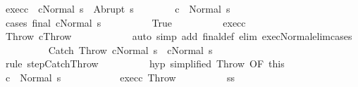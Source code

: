 \begin{isabellebody}
\ exec{\isacharunderscore}c\ {\isachardoublequoteopen}{\isasymGamma}{\isasymturnstile}\ {\isasymlangle}cNormal\ s{\isasymrangle}\ {\isasymRightarrow}\ Abrupt\ s{\isacharprime}{\isachardoublequoteclose}\isanewline
\ \ \ \ \ \ \isamarkupfalse%
\ {\isachardoublequoteopen}{\isasymGamma}{\isasymturnstile}c\ {\isasymdown}\ Normal\ s{\isacharprime}{\isachardoublequoteclose}\isanewline
\ \ \ \ \ \ \isamarkupfalse%
\ {\isacharparenleft}cases\ {\isachardoublequoteopen}final\ {\isacharparenleft}cNormal\ s{\isacharparenright}{\isachardoublequoteclose}{\isacharparenright}\isanewline
\ \ \ \ \ \ \ \ \isamarkupfalse%
\ True\isanewline
\ \ \ \ \ \ \ \ \isamarkupfalse%
\ exec{\isacharunderscore}c\isanewline
\ \ \ \ \ \ \ \ \isamarkupfalse%
\ Throw{\isacharcolon}\ {\isachardoublequoteopen}cThrow{\isachardoublequoteclose}\isanewline
\ \ \ \ \ \ \ \ \ \ \isamarkupfalse%
\ {\isacharparenleft}auto\ simp\ add{\isacharcolon}\ final{\isacharunderscore}def\ elim{\isacharcolon}\ exec{\isacharunderscore}Normal{\isacharunderscore}elim{\isacharunderscore}cases{\isacharparenright}\isanewline
\ \ \ \ \ \ \ \ \isamarkupfalse%
\ {\isachardoublequoteopen}{\isasymGamma}{\isasymturnstile}{\isacharparenleft}Catch\ Throw\ cNormal\ s{\isacharparenright}\ {\isasymrightarrow}\ {\isacharparenleft}cNormal\ s{\isacharparenright}{\isachardoublequoteclose}\isanewline
\ \ \ \ \ \ \ \ \ \ \isamarkupfalse%
\ {\isacharparenleft}rule\ step{\isachardot}CatchThrow{\isacharparenright}\isanewline
\ \ \ \ \ \ \ \ \isamarkupfalse%
\ hyp\ {\isacharbrackleft}simplified\ Throw{\isacharcomma}\ OF\ this{\isacharbrackright}\isanewline
\ \ \ \ \ \ \ \ \isamarkupfalse%
\ {\isachardoublequoteopen}{\isasymGamma}{\isasymturnstile}c\ {\isasymdown}\ Normal\ s{\isachardoublequoteclose}\isacommand{{\isachardot}}\isamarkupfalse%
\isanewline
\ \ \ \ \ \ \ \ \isamarkupfalse%
\ \isamarkupfalse%
\ exec{\isacharunderscore}c\ Throw\isanewline
\ \ \ \ \ \ \ \ \isamarkupfalse%
\ {\isachardoublequoteopen}s{\isacharprime}{\isacharequal}s{\isachardoublequoteclose}\isanewline
\ \ \ \ \ \ \ \ \ \ \isamarkupfalse%

\end{isabellebody}
